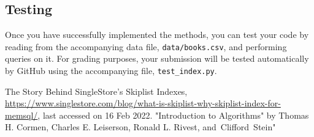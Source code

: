\documentclass[addpoints]{exam}
\begin{document}
\subsection{Testing}

Once you have successfully implemented the methods, you can test your code by reading from the accompanying data file, \texttt{data/books.csv}, and performing queries on it. For grading purposes, your submission will be tested automatically by GitHub using the accompanying  file, \texttt{test\_index.py}.

\newpage


\newpage
\newpage
\begin{thebibliography}{9}

  The Story Behind SingleStore’s Skiplist Indexes, \url{https://www.singlestore.com/blog/what-is-skiplist-why-skiplist-index-for-memsql/}, last accessed on 16 Feb 2022.
  "Introduction to Algorithms" by Thomas H. Cormen, Charles E. Leiserson, Ronald L. Rivest, and Clifford Stein"
  
  \end{thebibliography}
\end{document}
